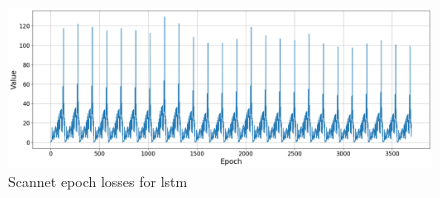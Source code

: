 	\begin{figure}
		\centering
		\includegraphics[width=13cm]{images/scannet_lstm_epoch_all.png}
		\caption{Scannet epoch losses for lstm}
		\label{fig:android_result}
	\end{figure}



